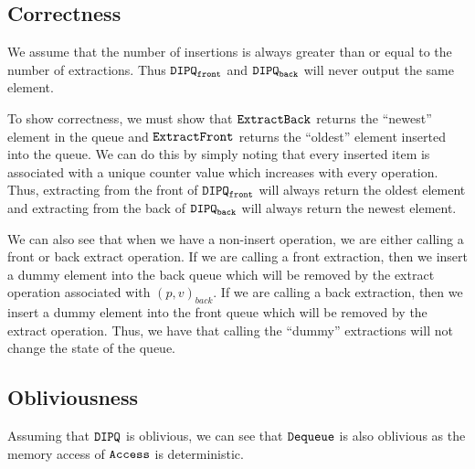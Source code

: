 \subsection{Correctness}
We assume that the number of insertions is always greater than or equal to the number of extractions.
Thus $\texttt{DIPQ}_{\texttt{front}}$ and $\texttt{DIPQ}_{\texttt{back}}$ will never output the same element.

To show correctness, we must show that $\texttt{ExtractBack}$ returns the ``newest'' element in the queue and $\texttt{ExtractFront}$ returns the ``oldest'' element inserted into the queue.
We can do this by simply noting that every inserted item is associated with a unique counter value which increases with every operation.
Thus, extracting from the front of $\texttt{DIPQ}_{\texttt{front}}$ will always return the oldest element and extracting from the back of $\texttt{DIPQ}_{\texttt{back}}$ will always return the newest element.

We can also see that when we have a non-insert operation, we are either calling a front or back extract operation.
If we are calling a front extraction, then we insert a dummy element into the back queue which will be removed by the extract operation associated with $(p, v)_{back}$.
If we are calling a back extraction, then we insert a dummy element into the front queue which will be removed by the extract operation.
Thus, we have that calling the ``dummy'' extractions will not change the state of the queue.

\subsection{Obliviousness}
Assuming that $\texttt{DIPQ}$ is oblivious, we can see that $\texttt{Dequeue}$ is also oblivious as the memory access of $\texttt{Access}$ is deterministic.



